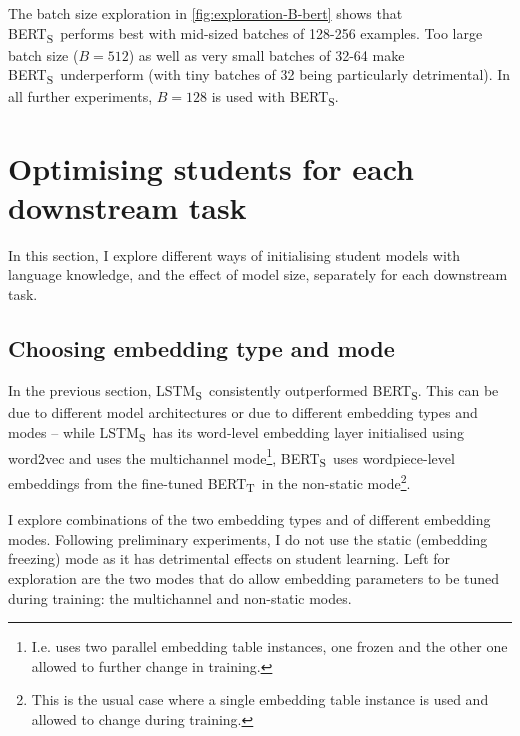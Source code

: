 \documentclass[bsc,frontabs,singlespacing,parskip,deptreport]{infthesis}
\def\BERTT{BERT\textsubscript{T}}
\def\BERTS{BERT\textsubscript{S}}
\def\LSTMS{LSTM\textsubscript{S}}
\begin{document}
{{{      The batch size exploration in \autoref{fig:exploration-B-bert} shows that \BERTS~performs best with mid-sized batches of 128-256 examples. Too large batch size ($B=512$) as well as very small batches of 32-64 make \BERTS~underperform (with tiny batches of 32 being particularly detrimental).
      In all further experiments, $B=128$ is used with \BERTS.
    }
  }

  \section{Optimising students for each downstream task}{
    In this section, I explore different ways of initialising student models with language knowledge, and the effect of model size, separately for each downstream task.

    \subsection{Choosing embedding type and mode}{
      In the previous section, \LSTMS~consistently outperformed \BERTS. This can be due to different model architectures or due to different embedding types and modes -- while \LSTMS~has its word-level embedding layer initialised using word2vec and uses the multichannel mode\footnote{I.e. uses two parallel embedding table instances, one frozen and the other one allowed to further change in training.}, \BERTS~uses wordpiece-level embeddings from the fine-tuned \BERTT~in the non-static mode\footnote{This is the usual case where a single embedding table instance is used and allowed to change during training.}.

      I explore combinations of the two embedding types and of different embedding modes. Following preliminary experiments, I do not use the static (embedding freezing) mode as it has detrimental effects on student learning. Left for exploration are the two modes that do allow embedding parameters to be tuned during training: the multichannel and non-static modes.

}}}
\end{document}
